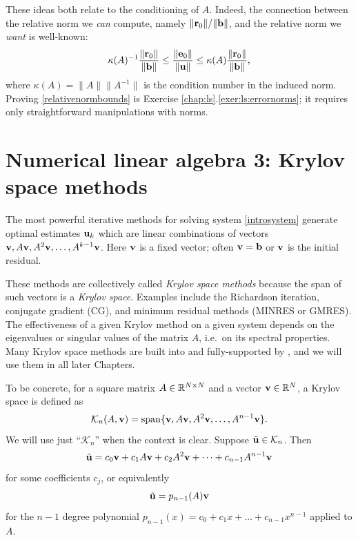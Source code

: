 These ideas both relate to the conditioning of $A$.  Indeed, the connection between the relative norm we \emph{can} compute, namely $\|\mathbf{r}_0\|/\|\mathbf{b}\|$, and the relative norm we \emph{want} is well-known:
\begin{equation}
\kappa(A)^{-1} \frac{\|\mathbf{r}_0\|}{\|\mathbf{b}\|} \le \frac{\|\mathbf{e}_0\|}{\|\mathbf{u}\|} \le \kappa(A) \frac{\|\mathbf{r}_0\|}{\|\mathbf{b}\|}, \label{relativenormbounds}
\end{equation}
where $\kappa(A) = \|A\| \|A^{-1}\|$ is the condition number in the induced norm.  Proving \eqref{relativenormbounds} is Exercise \ref{chap:ls}.\ref{exer:ls:errornorms}; it requires only straightforward manipulations with norms.


\section{Numerical linear algebra 3: Krylov space methods}

The most powerful iterative methods for solving system \eqref{introsystem} generate optimal estimates $\mathbf{u}_k$ which are linear combinations of vectors $\mathbf{v},A\mathbf{v},A^2\mathbf{v},\dots,A^{k-1}\mathbf{v}$.  Here $\mathbf{v}$ is a fixed vector; often $\mathbf{v}=\mathbf{b}$ or $\mathbf{v}$ is the initial residual.

These methods are collectively called \emph{Krylov space methods} because the span of such vectors is a \emph{Krylov space}.  Examples include the Richardson iteration, conjugate gradient (CG), and minimum residual methods (MINRES or GMRES).  The effectiveness of a given Krylov method on a given system depends on the eigenvalues or singular values of the matrix $A$, i.e.~on its spectral properties.  Many Krylov space methods are built into and fully-supported by \PETSc, and we will use them in all later Chapters.

To be concrete, for a square matrix $A\in \mathbb{R}^{N\times N}$ and a vector $\mathbf{v}\in\mathbb{R}^N$, a Krylov space is defined as
\begin{equation}
    \mathcal{K}_n(A,\mathbf{v}) = \operatorname{span}\{\mathbf{v},A\mathbf{v},A^2\mathbf{v},\dots,A^{n-1}\mathbf{v}\}. \label{eq:ls:krylovdefn}
\end{equation}
We will use just ``$\mathcal{K}_n$'' when the context is clear.  Suppose $\tilde{\mathbf{u}} \in \mathcal{K}_n$.  Then
    $$\tilde{\mathbf{u}} = c_0 \mathbf{v} + c_1 A \mathbf{v} + c_2 A^2 \mathbf{v} + \dots + c_{n-1} A^{n-1} \mathbf{v}$$
for some coefficients $c_j$, or equivalently
    $$\tilde{\mathbf{u}} = p_{n-1}(A) \mathbf{v}$$
for the $n-1$ degree polynomial $p_{n-1}(x) = c_0 + c_1 x + \dots + c_{n-1} x^{n-1}$ applied to $A$.


